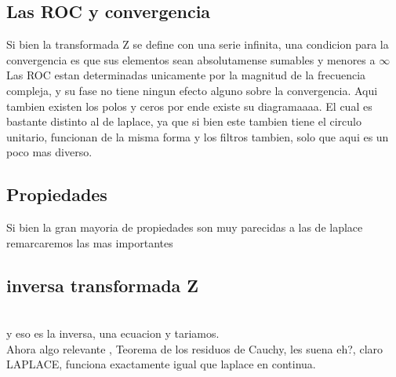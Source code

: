 \subsection{Las ROC y convergencia}
Si bien la transformada Z se define con una serie infinita, una condicion para la convergencia es que sus elementos sean absolutamense sumables y menores a $\infty$ \\ Las ROC estan determinadas unicamente por la magnitud de la frecuencia compleja, y su fase no tiene ningun efecto alguno sobre la convergencia.
Aqui tambien existen los polos y ceros por ende existe su diagramaaaa. El cual es bastante distinto al de laplace, ya que si bien este tambien tiene el circulo unitario, funcionan de la misma forma y los filtros tambien, solo que aqui es un poco mas diverso.
\subsection{Propiedades}
Si bien la gran mayoria de propiedades son muy parecidas a las de laplace remarcaremos las mas importantes
\subsection{inversa transformada Z}
\\
y eso es la inversa, una ecuacion y tariamos. \\
Ahora algo relevante , Teorema de los residuos de Cauchy, les suena eh?, claro LAPLACE, funciona exactamente igual que laplace en continua.\\\\\\


